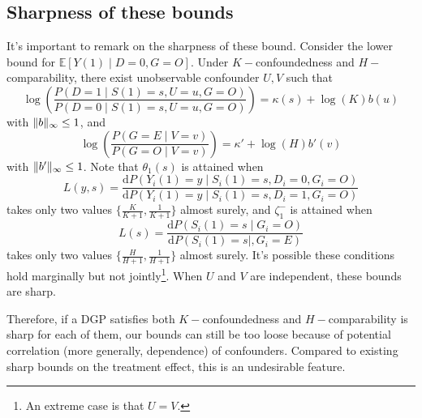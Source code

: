 \documentclass[12pt]{article}
\newtheorem{rmk}{Remark}
\newcommand{\Ep}{\mathbb{E}}
\DeclarePairedDelimiter{\norm}{\lVert}{\rVert}
\begin{document}
	\subsection{Sharpness of these bounds}
	It's important to remark on the sharpness of these bound. Consider the lower bound for $\Ep[Y(1) \mid D = 0, G = O]$. Under $K-$confoundedness and $H-$comparability, there exist unobservable confounder $U,V$ such that $$\log \left(\frac{P(D=1 \mid S(1) = s, U=u, G = O)}{P(D=0 \mid S(1)=s, U=u, G = O)}\right)=\kappa(s)+\log (K) b(u)$$ with $\norm{b}_{\infty} \leq 1$, and 
	$$\log \left(\frac{P(G=E \mid V=v)}{P(G=O \mid V=v)}\right)=\kappa'+\log (H) b'(v)$$ with $\norm{b'}_{\infty} \leq 1$. Note that $\theta_1(s)$ is attained when
	$$L(y,s) = \frac{\mathrm{d} P(Y_i(1) = y \mid S_i(1) = s, D_i =0, G_i = O)}{\mathrm{d} P(Y_i(1) = y \mid S_i(1) = s, D_i = 1, G_i = O)}$$ takes only two values  $\{\frac{K}{K + 1}, \frac{1}{K + 1}\}$ almost surely, and $\zeta_1^-$ is attained when  
	$$L(s) = \frac{\mathrm{d} P(S_i(1) = s \mid G_i = O)}{\mathrm{d} P(S_i(1) = s \mid , G_i = E)}$$
	takes only two values  $\{\frac{H}{H + 1}, \frac{1}{H + 1}\}$ almost surely. It's possible these conditions hold marginally but not jointly\footnote{An extreme case is that $U = V$.}. When $U$ and $V$ are independent, these bounds are sharp.
	
	Therefore, if a DGP satisfies both $K-$confoundedness and $H-$comparability is sharp for each of them, our bounds can still be too loose because of potential correlation (more generally, dependence) of confounders. Compared to existing sharp bounds on the treatment effect, this is an undesirable feature.
	
\end{document}

